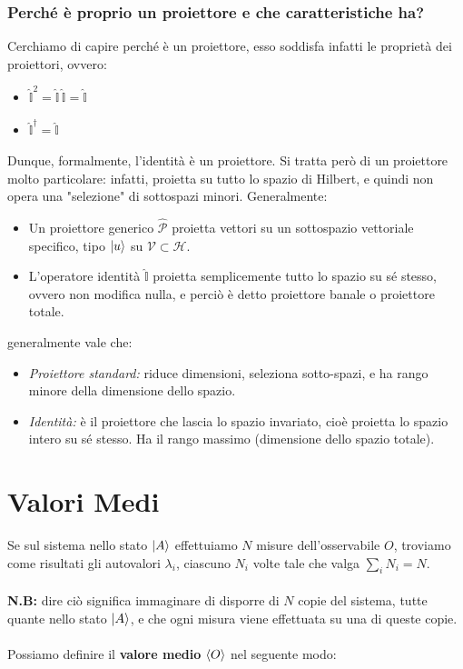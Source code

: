 \subsubsection{Perché è proprio un proiettore e che caratteristiche ha?}

	Cerchiamo di capire perché è un proiettore, esso soddisfa infatti le proprietà dei proiettori, ovvero:
	
\begin{itemize}
	\item $\hat{\mathbb{I}}^2 = \hat{\mathbb{I}} \, \hat{\mathbb{I}} = \hat{\mathbb{I}}$
	\item $\hat{\mathbb{I}}^{\dagger} = \hat{\mathbb{I}}$
\end{itemize}

	Dunque, formalmente, l'identità è un proiettore. Si tratta però di un proiettore molto particolare: infatti, proietta su tutto lo spazio di Hilbert, e quindi non opera una "selezione" di sottospazi minori. Generalmente:

\begin{itemize}
	\item Un proiettore generico $\hat{\mathcal{P}}$ proietta vettori su un sottospazio vettoriale specifico, tipo $\ket{u}$ su $\mathcal{V} \subset \mathcal{H}$.
	\item L’operatore identità $\hat{\mathbb{I}}$ proietta semplicemente tutto lo spazio su sé stesso, ovvero non modifica nulla, e perciò è detto proiettore banale o proiettore totale.
\end{itemize}

	generalmente vale che:
	
\begin{itemize}
	\item \textit{Proiettore standard:} riduce dimensioni, seleziona sotto-spazi, e ha rango minore della dimensione dello spazio.
	\item \textit{Identità:} è il proiettore che lascia lo spazio invariato, cioè proietta lo spazio intero su sé stesso. Ha il rango massimo (dimensione dello spazio totale).
\end{itemize}

\section{Valori Medi}

	Se sul sistema nello stato $\ket{A}$ effettuiamo $N$ misure dell'osservabile $O$, troviamo come risultati gli autovalori $\lambda_i$, ciascuno $N_i$ volte tale che valga $\sum_i N_i = N$.
	\\
	\\
	\textbf{N.B:} dire ciò significa immaginare di disporre di $N$ copie del sistema, tutte quante nello stato $\ket{A}$, e che ogni misura viene effettuata su una di queste copie.
	\\
	\\
	Possiamo definire il \textbf{valore medio} $\langle O \rangle$ nel seguente modo:

